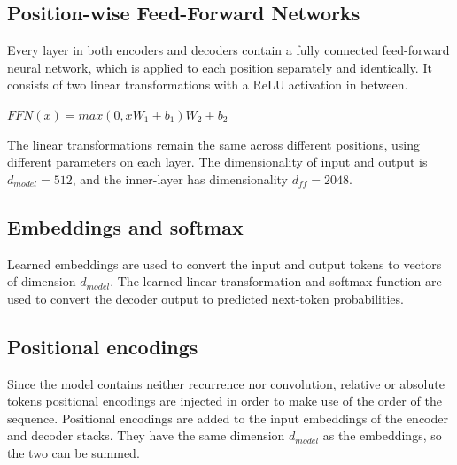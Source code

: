 \documentclass[\main/main.tex]{subfiles}
\begin{document}
\subsection{Position-wise Feed-Forward Networks}
Every layer in both encoders and decoders contain a fully connected feed-forward neural network, which is applied to each position separately and identically.
It consists of two linear transformations with a ReLU activation in between.
\begin{center}
    $FFN(x) = max(0, xW_1 + b_1)W_2 + b_2$
\end{center}
The linear transformations remain the same across different positions, using different parameters on each layer. The dimensionality of input and output is $d_{model} = 512$, and the inner-layer has dimensionality $d_{ff} = 2048$.

\subsection{Embeddings and softmax}
Learned embeddings are used to convert the input and output tokens to vectors of dimension $d_{model}$. The learned linear transformation and softmax function are used to convert the decoder output to predicted next-token probabilities.

\subsection{Positional encodings}
Since the model contains neither recurrence nor convolution, relative or absolute tokens positional encodings are injected in order to make use of the order of the sequence. Positional encodings are added to the input embeddings of the encoder and decoder stacks. They have the same dimension $d_{model}$ as the embeddings, so the two can be summed.

\end{document}
